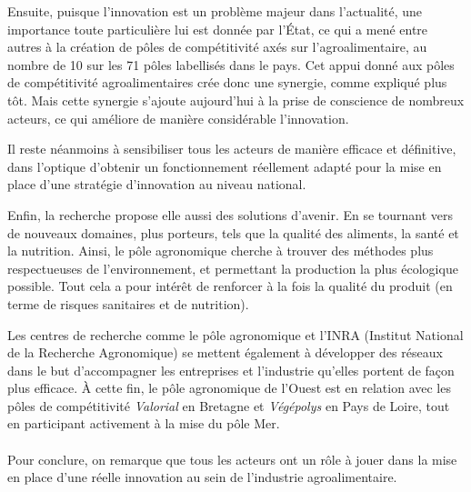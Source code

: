 \documentclass[a4paper,12pt]{report}
\begin{document}
			

			Ensuite, puisque l’innovation est un problème majeur dans l’actualité, une importance toute particulière lui est donnée par l’État, ce qui a mené entre autres à la création de pôles de compétitivité axés sur l’agroalimentaire, au nombre de 10 sur les 71 pôles labellisés dans le pays\cite{CompetitiviteGouv}. Cet appui donné aux pôles de compétitivité agroalimentaires crée donc une synergie, comme expliqué plus tôt. Mais cette synergie s’ajoute aujourd’hui à la prise de conscience de nombreux acteurs, ce qui améliore de manière considérable l’innovation.
			
			Il reste néanmoins à sensibiliser tous les acteurs de manière efficace et définitive, dans l’optique d’obtenir un fonctionnement réellement adapté pour la mise en place d’une stratégie d’innovation au niveau national.

			Enfin, la recherche propose elle aussi des solutions d’avenir. En se tournant vers de nouveaux domaines, plus porteurs, tels que la qualité des aliments, la santé et la nutrition. Ainsi, le pôle agronomique cherche à trouver des méthodes plus respectueuses de l’environnement, et permettant la production la plus écologique possible\cite{PoleAgroOuest}. Tout cela a pour intérêt de renforcer à la fois la qualité du produit (en terme de risques sanitaires et de nutrition).
			
			Les centres de recherche comme le pôle agronomique et l’INRA (Institut National de la Recherche Agronomique) se mettent également à développer des réseaux dans le but d’accompagner les entreprises et l’industrie qu’elles portent de façon plus efficace. À cette fin, le pôle agronomique de l’Ouest est en relation avec les pôles de compétitivité \textit{Valorial} en Bretagne et \textit{Végépolys} en Pays de Loire, tout en participant activement à la mise du pôle Mer\cite{PoleAgroOuest}. 

		\paragraph{}Pour conclure, on remarque que tous les acteurs ont un rôle à jouer dans la mise en place d’une réelle innovation au sein de l’industrie agroalimentaire.
\end{document}
